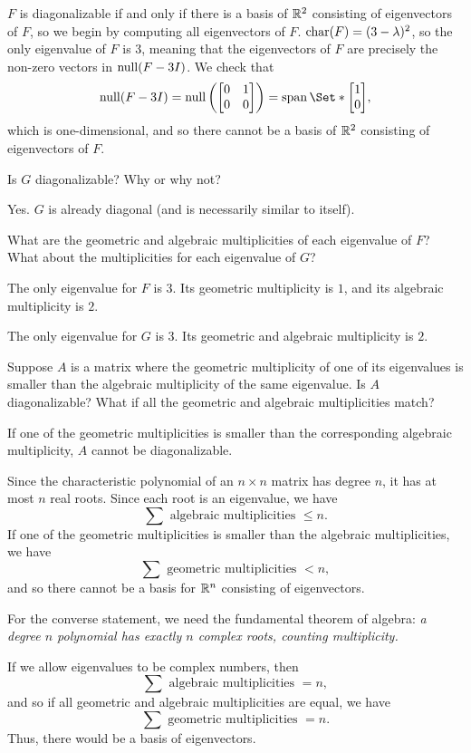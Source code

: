 \documentclass{workbook}
\begin{document}
\begin{slide}
\begin{parts}
\begin{solution}
				$F$ is diagonalizable if and only if there is a basis of $\mathbb{R}^2$
				consisting of eigenvectors of $F$, so we begin by computing all
				eigenvectors of $F$.
				$\operatorname{char}(F)=(3-\lambda)^2$, so the only eigenvalue of $F$ is $3$,
				meaning that the eigenvectors of $F$ are precisely the non-zero
				vectors in $\operatorname{null}(F-3I)$. We check that
				\[
					\Null(F-3I)
					=\Null\left(\mat{0&1\\0&0}\right)
					=\Span\Set*{\mat{1\\0}},
				\]
				which is one-dimensional, and so there cannot be a basis of $\mathbb{R}^2$
				consisting of eigenvectors of $F$.
			\end{solution}
		\item Is $G$ diagonalizable?  Why or why not?
			\begin{solution}
				Yes. $G$ is already diagonal (and is necessarily similar to itself).
			\end{solution}
		\item What are the geometric and algebraic multiplicities of each eigenvalue
			of $F$? What about the multiplicities for each eigenvalue of $G$?
			\begin{solution}
				The only eigenvalue for $F$ is $3$. Its geometric multiplicity is $1$,
				and its algebraic multiplicity is $2$.

				The only eigenvalue for $G$ is $3$. Its geometric and algebraic multiplicity is $2$.
			\end{solution}
		\item Suppose $A$ is a matrix where the geometric multiplicity of one of its eigenvalues
			is smaller than the algebraic multiplicity of the same eigenvalue.  Is
			$A$ diagonalizable?  What if all the geometric and algebraic multiplicities
			match?
		\begin{solution}
				If one of the geometric multiplicities is smaller than the corresponding
				algebraic multiplicity, $A$ cannot be diagonalizable.

				Since the characteristic polynomial of an $n\times n$ matrix has degree $n$,
				it has at most $n$ real roots. Since each root is an eigenvalue, we have
				\[
					\sum \text{ algebraic multiplicities }\leq n.
				\]
				If one of the geometric multiplicities is smaller than the algebraic multiplicities,
				we have
				\[
					\sum \text{ geometric multiplicities } < n,
				\]
				and so there cannot be a basis for $\mathbb{R}^n$ consisting of eigenvectors.

				For the converse statement, we need the fundamental theorem of algebra:\emph{
					a degree $n$ polynomial has exactly $n$ complex roots, counting multiplicity.}

				If we allow eigenvalues to be complex numbers, then
				\[
					\sum \text{ algebraic multiplicities }= n,
				\]
				and so if all geometric and algebraic multiplicities are equal, we have
				\[
					\sum \text{ geometric multiplicities } = n.
				\]
				Thus, there would be a basis of eigenvectors.
			\end{solution}
	\end{parts}
\end{slide}
\end{document}
